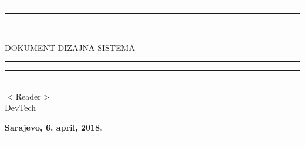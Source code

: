 \documentclass{scrreprt}
\date{}
\begin{document}
\begin{titlepage}
\begin{flushright}
    \rule[0.5ex]{\linewidth}{2pt}\vspace*{-\baselineskip}\vspace*{3.2pt}
    \rule[0.5ex]{\linewidth}{1pt}\\[\baselineskip]
    \begin{bfseries}
        \Huge{DOKUMENT DIZAJNA SISTEMA}\\
            \rule[0.5ex]{\linewidth}{2pt}\vspace*{-\baselineskip}\vspace*{3.2pt}
    \rule[0.5ex]{\linewidth}{1pt}\\[\baselineskip]
        \vspace{1.9cm}
        \vspace{1.9cm}
        $<$Reader$>$\\
        \vspace{3cm}
        \vspace{1.9cm}
        DevTech
        \vspace{4cm}
    \end{bfseries}
\end{flushright}

\begin{center}
    \Large\textbf{Sarajevo, 6. april, 2018.} 
    \rule[0.5ex]{\linewidth}{2pt}\vspace*{-\baselineskip}\vspace*{3.2pt}
\end{center}

\end{titlepage}

\tableofcontents






\end{document}
